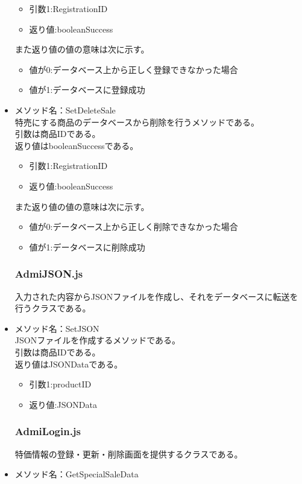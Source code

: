 \documentclass[a4j]{jarticle}
\begin{document}
\begin{itemize}
	\begin{itemize}
		\item 引数1:RegistrationID
		\item 返り値:booleanSuccess
	\end{itemize}
また返り値の値の意味は次に示す。
	\begin{itemize}
		\item 値が0:データベース上から正しく登録できなかった場合
		\item 値が1:データベースに登録成功
	\end{itemize}
\item メソッド名：SetDeleteSale\\
特売にする商品のデータベースから削除を行うメソッドである。\\
引数は商品IDである。\\
返り値はbooleanSuccessである。

	\begin{itemize}
		\item 引数1:RegistrationID
		\item 返り値:booleanSuccess
	\end{itemize}
また返り値の値の意味は次に示す。
	\begin{itemize}
		\item 値が0:データベース上から正しく削除できなかった場合
		\item 値が1:データベースに削除成功
	\end{itemize}
	\subsubsection{AdmiJSON.js}
入力された内容からJSONファイルを作成し、それをデータベースに転送を行うクラスである。\\

\item メソッド名：SetJSON\\

JSONファイルを作成するメソッドである。\\
引数は商品IDである。\\
返り値はJSONDataである。
	\begin{itemize}
		\item 引数1:productID
		\item 返り値:JSONData
	\end{itemize}
\subsubsection{AdmiLogin.js}
特価情報の登録・更新・削除画面を提供するクラスである。
%
\item メソッド名：GetSpecialSaleData\\


\end{itemize}
\end{document}
